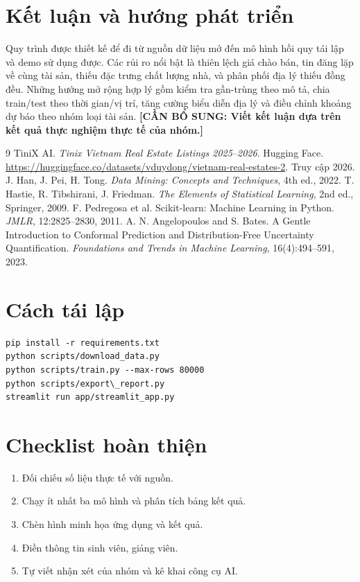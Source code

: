 \documentclass[12pt,a4paper]{report}
\newcommand{\todo}[1]{\textbf{[CẦN BỔ SUNG: #1]}}
\begin{document}
\chapter{Kết luận và hướng phát triển}
Quy trình được thiết kế để đi từ nguồn dữ liệu mở đến mô hình hồi quy tái lập và demo sử dụng được. Các rủi ro nổi bật là thiên lệch giá chào bán, tin đăng lặp về cùng tài sản, thiếu đặc trưng chất lượng nhà, và phân phối địa lý thiếu đồng đều. Những hướng mở rộng hợp lý gồm kiểm tra gần-trùng theo mô tả, chia train/test theo thời gian/vị trí, tăng cường biểu diễn địa lý và điều chỉnh khoảng dự báo theo nhóm loại tài sản. \todo{Viết kết luận dựa trên kết quả thực nghiệm thực tế của nhóm.}
\begin{thebibliography}{9}
 TiniX AI. \emph{Tinix Vietnam Real Estate Listings 2025--2026}. Hugging Face. \url{https://huggingface.co/datasets/vduydong/vietnam-real-estates-2}. Truy cập 2026.
 J. Han, J. Pei, H. Tong. \emph{Data Mining: Concepts and Techniques}, 4th ed., 2022.
 T. Hastie, R. Tibshirani, J. Friedman. \emph{The Elements of Statistical Learning}, 2nd ed., Springer, 2009.
 F. Pedregosa et al. Scikit-learn: Machine Learning in Python. \emph{JMLR}, 12:2825--2830, 2011.
 A. N. Angelopoulos and S. Bates. A Gentle Introduction to Conformal Prediction and Distribution-Free Uncertainty Quantification. \emph{Foundations and Trends in Machine Learning}, 16(4):494--591, 2023.
\end{thebibliography}
\appendix\chapter{Cách tái lập}\begin{verbatim}
pip install -r requirements.txt
python scripts/download_data.py
python scripts/train.py --max-rows 80000
python scripts/export\_report.py
streamlit run app/streamlit_app.py
\end{verbatim}
\chapter{Checklist hoàn thiện}\begin{enumerate}\item Đối chiếu số liệu thực tế với nguồn.\item Chạy ít nhất ba mô hình và phân tích bảng kết quả.\item Chèn hình minh họa ứng dụng và kết quả.\item Điền thông tin sinh viên, giảng viên.\item Tự viết nhận xét của nhóm và kê khai công cụ AI.\end{enumerate}
\end{document}
